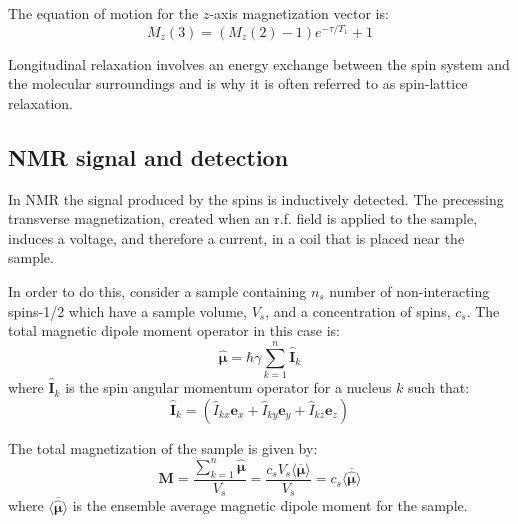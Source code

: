 The equation of motion for the $z$-axis magnetization vector is:
\begin{equation}
  M_z(3) = (M_z(2) - 1)e^{-\tau/T_1} + 1
\end{equation}

Longitudinal relaxation involves an energy exchange between the spin system and the molecular
surroundings and is why it is often referred to as spin-lattice relaxation.

\subsection{NMR signal and detection}

In NMR the signal produced by the spins is inductively detected. The precessing transverse magnetization, created
when an r.f. field is applied to the sample, induces a voltage, and therefore a current, in a coil that
is placed near the sample.

In order to do this, consider a sample containing $n_s$ number of non-interacting spins-1/2 which have a
sample volume, $V_s$, and a concentration of spins, $c_s$.
The total magnetic dipole moment operator in this case is:
\begin{equation}\label{eqn:MagneticMoment}
  \hat{\boldsymbol{\mu}} = \hbar\gamma\sum_{k=1}^n\mathbf{\hat{I}}_k
\end{equation}
where $\mathbf{\hat{I}}_k$ is the spin angular momentum operator for a nucleus $k$ such that:
\begin{equation}
  \mathbf{\hat{I}}_k = (\hat{I}_{kx}\mathbf{e}_x + \hat{I}_{ky}\mathbf{e}_y + \hat{I}_{kz}\mathbf{e}_z)
\end{equation}

The total magnetization of the sample is given by:
\begin{equation}\label{eqn:magnetization}
  \mathbf{M} = \frac{\sum_{k=1}^n\hat{\boldsymbol{\mu}}}{V_s} = \frac{c_sV_s\langle\overbar{\boldsymbol{\mu}}\rangle}{V_s} = c_s\langle\overbar{\hat{\boldsymbol{\mu}}}\rangle
\end{equation}
where $\langle\overbar{\hat{\boldsymbol{\mu}}}\rangle$ is the ensemble average magnetic dipole moment for the sample.

